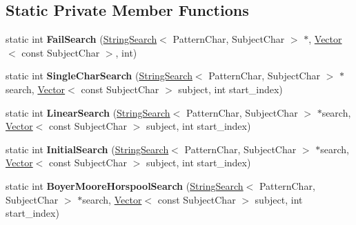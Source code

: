 \subsection*{Static Private Member Functions}
\begin{DoxyCompactItemize}
\item 
static int {\bfseries Fail\+Search} (\hyperlink{classv8_1_1internal_1_1_string_search}{String\+Search}$<$ Pattern\+Char, Subject\+Char $>$ $\ast$, \hyperlink{classv8_1_1internal_1_1_vector}{Vector}$<$ const Subject\+Char $>$, int)\hypertarget{classv8_1_1internal_1_1_string_search_a786c16ae8ce2b8654bbf504a3ce13762}{}\label{classv8_1_1internal_1_1_string_search_a786c16ae8ce2b8654bbf504a3ce13762}

\item 
static int {\bfseries Single\+Char\+Search} (\hyperlink{classv8_1_1internal_1_1_string_search}{String\+Search}$<$ Pattern\+Char, Subject\+Char $>$ $\ast$search, \hyperlink{classv8_1_1internal_1_1_vector}{Vector}$<$ const Subject\+Char $>$ subject, int start\+\_\+index)\hypertarget{classv8_1_1internal_1_1_string_search_ac322eaabc5667b5386ada44886ed4f7f}{}\label{classv8_1_1internal_1_1_string_search_ac322eaabc5667b5386ada44886ed4f7f}

\item 
static int {\bfseries Linear\+Search} (\hyperlink{classv8_1_1internal_1_1_string_search}{String\+Search}$<$ Pattern\+Char, Subject\+Char $>$ $\ast$search, \hyperlink{classv8_1_1internal_1_1_vector}{Vector}$<$ const Subject\+Char $>$ subject, int start\+\_\+index)\hypertarget{classv8_1_1internal_1_1_string_search_a113f0fcd53d64d4f0d84a7efcbd4dc17}{}\label{classv8_1_1internal_1_1_string_search_a113f0fcd53d64d4f0d84a7efcbd4dc17}

\item 
static int {\bfseries Initial\+Search} (\hyperlink{classv8_1_1internal_1_1_string_search}{String\+Search}$<$ Pattern\+Char, Subject\+Char $>$ $\ast$search, \hyperlink{classv8_1_1internal_1_1_vector}{Vector}$<$ const Subject\+Char $>$ subject, int start\+\_\+index)\hypertarget{classv8_1_1internal_1_1_string_search_ab952d55907e5747e907f3b7ff2ce171d}{}\label{classv8_1_1internal_1_1_string_search_ab952d55907e5747e907f3b7ff2ce171d}

\item 
static int {\bfseries Boyer\+Moore\+Horspool\+Search} (\hyperlink{classv8_1_1internal_1_1_string_search}{String\+Search}$<$ Pattern\+Char, Subject\+Char $>$ $\ast$search, \hyperlink{classv8_1_1internal_1_1_vector}{Vector}$<$ const Subject\+Char $>$ subject, int start\+\_\+index)\hypertarget{classv8_1_1internal_1_1_string_search_a02bf298feef5ad59455aacef00b2fb87}{}\label{classv8_1_1internal_1_1_string_search_a02bf298feef5ad59455aacef00b2fb87}


\end{DoxyCompactItemize}
